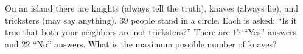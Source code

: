 On an island there are knights (always tell the truth), knaves (always lie), and tricksters (may say anything). $39$ people stand in a circle. Each is asked: ``Is it true that both your neighbors are not tricksters?'' There are $17$ ``Yes'' answers and $22$ ``No'' answers. What is the maximum possible number of knaves?
